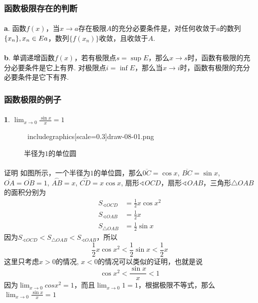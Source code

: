 \subsubsection{函数极限存在的判断}
\paragraph{}
\textbf{a}. 函数$f(x)$，当$x \to a$存在极限$A$的充分必要条件是，对任何收敛于$a$的数列$\{ x_n \}, x_n \in E\\a$，数列$\{f(x_n)\}$收敛，且收敛于$A$.

\paragraph{}
\textbf{b}. 单调递增函数$f(x)$，若有极限点$s = \sup E$，那么$x \to s$时，函数有极限的充分必要条件是它上有界. 对极限点$i = \inf E$，那么当$x \to i$时，函数有极限的充分必要条件是它下有界.


\subsubsection{函数极限的例子}

\paragraph{}
\textbf{1}. $\lim_{x\to 0} \frac{\sin x}{x} = 1$

\begin{figure}[h]
\centering
\ includegraphics[scale=0.3]{draw-08-01.png}
\caption{半径为$1$的单位圆}
\end{figure}

\paragraph{}
证明\:  如图所示，一个半径为$1$的单位圆，那么$\overline{0C} = \cos{x}$, $\overline{BC} = \sin{x}$, $\overline{OA} = \overline{OB} = 1$, $\stackrel\frown{AB} = x$, $\stackrel\frown{CD} = x \cos{x}$,  扇形$\sphericalangle{OCD}$，扇形$\sphericalangle{OAB}$，三角形$\bigtriangleup{OAB}$的面积分别为
\begin{align*}
S_{\sphericalangle{OCD}} & = \frac{1}{2} x \cos{x}^2  \\
S_{\sphericalangle{OAB}} & = \frac{1}{2}  x \\
S_{\bigtriangleup{OAB}} & = \frac{1}{2} \sin{x}
\end{align*}
因为$ S_{\sphericalangle{OCD}} < S_{\bigtriangleup{OAB}} < S_{\sphericalangle{OAB}}$，所以
$$
\frac{1}{2} x \cos{x}^2 <\frac{1}{2} \sin{x} <    \frac{1}{2} x
$$
这里只考虑$x > 0$的情况, $x < 0$的情况可以类似的证明，也就是说
$$
\cos{x}^2 < \frac{\sin{x}}{x} < 1
$$
因为$\lim_{x\to 0} cos{x}^2 = 1$，而且$\lim_{x \to 0} 1 = 1$，根据极限不等式，那么$\lim_{x\to 0} \frac{\sin{x}}{x} = 1$


